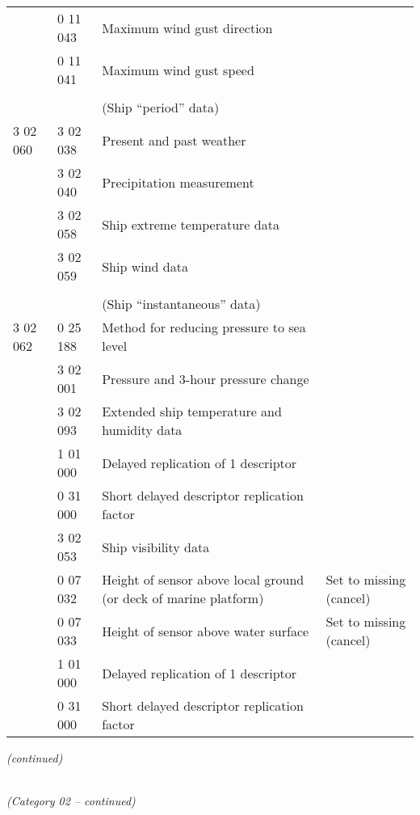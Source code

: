 \begin{longtable}[]{@{}llll@{}}
& 0 11 043 & Maximum wind gust direction &\tabularnewline
& 0 11 041 & Maximum wind gust speed &\tabularnewline
& & &\tabularnewline
& & (Ship ``period'' data) &\tabularnewline
3 02 060 & 3 02 038 & Present and past weather &\tabularnewline
& 3 02 040 & Precipitation measurement &\tabularnewline
& 3 02 058 & Ship extreme temperature data &\tabularnewline
& 3 02 059 & Ship wind data &\tabularnewline
& & &\tabularnewline
& & (Ship ``instantaneous'' data) &\tabularnewline
3 02 062 & 0 25 188 & Method for reducing pressure to sea level &\tabularnewline
& 3 02 001 & Pressure and 3-hour pressure change &\tabularnewline
& 3 02 093 & Extended ship temperature and humidity data &\tabularnewline
& 1 01 000 & Delayed replication of 1 descriptor &\tabularnewline
& 0 31 000 & Short delayed descriptor replication factor &\tabularnewline
& 3 02 053 & Ship visibility data &\tabularnewline
& 0 07 032 & Height of sensor above local ground (or deck of marine platform) & Set to missing (cancel)\tabularnewline
& 0 07 033 & Height of sensor above water surface & Set to missing (cancel)\tabularnewline
& 1 01 000 & Delayed replication of 1 descriptor &\tabularnewline
& 0 31 000 & Short delayed descriptor replication factor &\tabularnewline
\bottomrule
\end{longtable}

\emph{(continued)}

\emph{\\
(Category 02 -- continued)}

